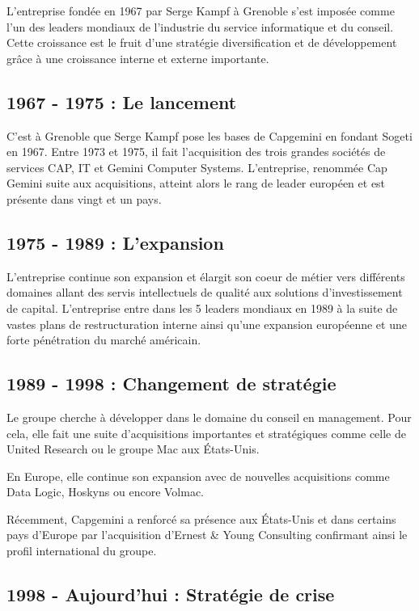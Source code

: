 L'entreprise fondée en 1967 par Serge Kampf à Grenoble s'est imposée comme l'un des leaders mondiaux de l'industrie du service informatique et du conseil. Cette croissance est le fruit d'une stratégie diversification et de développement grâce à une croissance interne et externe importante.

\subsection{1967 - 1975 : Le lancement}

    C'est à Grenoble que Serge Kampf pose les bases de Capgemini en fondant Sogeti en 1967. Entre 1973 et 1975, il fait l'acquisition des trois grandes sociétés de services CAP, IT et Gemini Computer Systems. L'entreprise, renommée Cap Gemini suite aux acquisitions, atteint alors le rang de leader européen et est présente dans vingt et un pays.
    
\subsection{1975 - 1989 : L'expansion}

    L'entreprise continue son expansion et élargit son coeur de métier vers différents domaines allant des servis intellectuels de qualité aux solutions d'investissement de capital. L'entreprise entre dans les 5 leaders mondiaux en 1989 à la suite de vastes plans de restructuration interne ainsi qu'une expansion européenne et une forte pénétration du marché américain.
    
\subsection{1989 - 1998 : Changement de stratégie}

    Le groupe cherche à développer dans le domaine du conseil en management. Pour cela, elle fait une suite d'acquisitions importantes et stratégiques comme celle de United Research ou le groupe Mac aux États-Unis.
    
    En Europe, elle continue son expansion avec de nouvelles acquisitions comme Data Logic, Hoskyns ou encore Volmac.
    
    Récemment, Capgemini a renforcé sa présence aux États-Unis et dans certains pays d'Europe par l'acquisition d'Ernest \& Young Consulting confirmant ainsi le profil international du groupe.
    
\subsection{1998 - Aujourd'hui : Stratégie de crise}

